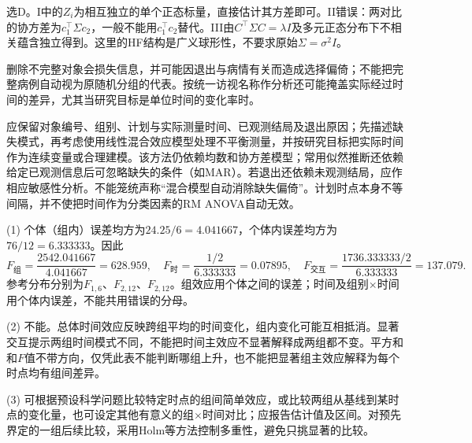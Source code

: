 选D。I中的$Z_i$为相互独立的单个正态标量，直接估计其方差即可。II错误：两对比的协方差为$c_1^\top\Sigma c_2$，一般不能用$c_1^\top c_2$替代。III由$C^\top\Sigma C=\lambda I$及多元正态分布下不相关蕴含独立得到。这里的HF结构是广义球形性，不要求原始$\Sigma=\sigma^2I$。
\par\nobreak\smallskip{}

删除不完整对象会损失信息，并可能因退出与病情有关而造成选择偏倚；不能把完整病例自动视为原随机分组的代表。按统一访视名称作分析还可能掩盖实际经过时间的差异，尤其当研究目标是单位时间的变化率时。

应保留对象编号、组别、计划与实际测量时间、已观测结局及退出原因；先描述缺失模式，再考虑使用线性混合效应模型处理不平衡测量，并按研究目标把实际时间作为连续变量或合理建模。该方法仍依赖均数和协方差模型；常用似然推断还依赖给定已观测信息后可忽略缺失的条件（如MAR）。若退出还依赖未观测结局，应作相应敏感性分析。不能笼统声称“混合模型自动消除缺失偏倚”。计划时点本身不等间隔，并不使把时间作为分类因素的RM ANOVA自动无效。
\par\nobreak\smallskip{}

(1) 个体（组内）误差均方为$24.25/6=4.041667$，个体内误差均方为$76/12=6.333333$。因此
\[
F_{\text{组}}=\frac{2542.041667}{4.041667}=628.959,\quad
F_{\text{时}}=\frac{1/2}{6.333333}=0.07895,\quad
F_{\text{交互}}=\frac{1736.333333/2}{6.333333}=137.079.
\]
参考分布分别为$F_{1,6}$、$F_{2,12}$、$F_{2,12}$。组效应用个体之间的误差；时间及组别$\times$时间用个体内误差，不能共用错误的分母。

(2) 不能。总体时间效应反映跨组平均的时间变化，组内变化可能互相抵消。显著交互提示两组时间模式不同，不能把时间主效应不显著解释成两组都不变。平方和和$F$值不带方向，仅凭此表不能判断哪组上升，也不能把显著组主效应解释为每个时点均有组间差异。

(3) 可根据预设科学问题比较特定时点的组间简单效应，或比较两组从基线到某时点的变化量，也可设定其他有意义的组$\times$时间对比；应报告估计值及区间。对预先界定的一组后续比较，采用Holm等方法控制多重性，避免只挑显著的比较。
\par\nobreak\smallskip{}

